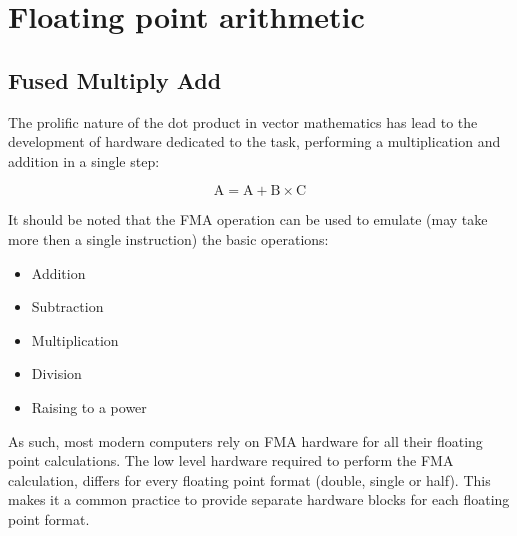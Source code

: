 \chapter{Floating point arithmetic}

\section{Fused Multiply Add}

\hspace{4mm}The prolific nature of the dot product in vector mathematics has lead to the development of hardware dedicated to the task, performing a multiplication and addition in a single step:

\begin{equation} \label{FMA eq.}
    \text{A} = \text{A} + \text{B} \times \text{C}
\end{equation}

\noindent It should be noted that the FMA operation can be used to emulate (may take more then a single instruction) the basic operations:

\begin{itemize}
    \item Addition
    \item Subtraction
    \item Multiplication
    \item Division
    \item Raising to a power
\end{itemize}

As such, most modern computers rely on FMA hardware for all their floating point calculations. The low level hardware required to perform the FMA calculation, differs for every floating point format (double, single or half). This makes it a common practice to provide separate hardware blocks for each floating point format.

\newpage